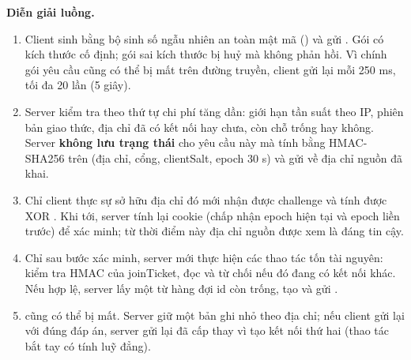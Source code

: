 \textbf{Diễn giải luồng.}
\begin{enumerate}
  \item Client sinh  bằng bộ sinh số ngẫu nhiên an toàn mật mã () và gửi
        . Gói có kích thước cố định; gói sai kích thước bị huỷ mà không phản hồi. Vì chính gói
        yêu cầu cũng có thể bị mất trên đường truyền, client gửi lại mỗi 250 ms, tối đa 20 lần (5 giây).
  \item Server kiểm tra theo thứ tự chi phí tăng dần: giới hạn tần suất theo IP, phiên bản giao thức, địa chỉ đã có kết
        nối hay chưa, còn chỗ trống hay không. Server \textbf{không lưu trạng thái} cho yêu cầu này mà tính
         bằng HMAC-SHA256 trên (địa chỉ, cổng, clientSalt, epoch 30 s) và gửi 
        về địa chỉ nguồn đã khai.
  \item Chỉ client thực sự sở hữu địa chỉ đó mới nhận được challenge và tính được  XOR
        . Khi  tới, server tính lại cookie (chấp nhận epoch hiện tại và epoch liền
        trước) để xác minh; từ thời điểm này địa chỉ nguồn được xem là đáng tin cậy.
  \item Chỉ sau bước xác minh, server mới thực hiện các thao tác tốn tài nguyên: kiểm tra HMAC của joinTicket, đọc
         và từ chối nếu  đó đang có kết nối khác. Nếu hợp lệ, server lấy một
         từ hàng đợi id còn trống, tạo  và gửi .
  \item {} cũng có thể bị mất. Server giữ một bản ghi nhỏ theo địa chỉ; nếu client gửi lại
         với đúng đáp án, server gửi lại  đã cấp thay vì tạo kết nối thứ hai
        (thao tác bắt tay có tính luỹ đẳng).
\end{enumerate}

